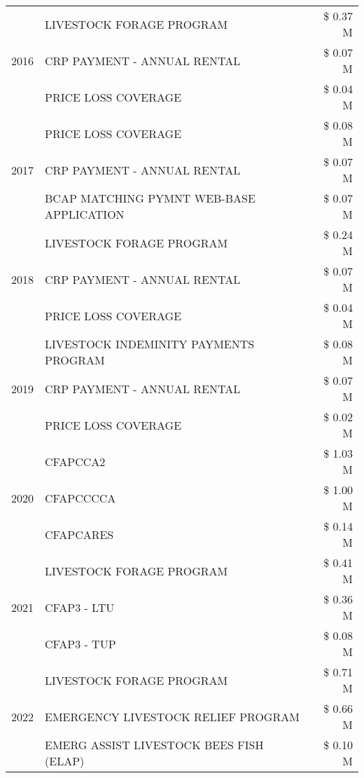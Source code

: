 \begin{tabular}{llr}
\cline{1-3}
\multirow[t]{3}{*}{2016} & LIVESTOCK FORAGE PROGRAM & \$ 0.37 M \\
 & CRP PAYMENT - ANNUAL RENTAL & \$ 0.07 M \\
 & PRICE LOSS COVERAGE & \$ 0.04 M \\
\cline{1-3}
\multirow[t]{3}{*}{2017} & PRICE LOSS COVERAGE & \$ 0.08 M \\
 & CRP PAYMENT - ANNUAL RENTAL & \$ 0.07 M \\
 & BCAP MATCHING PYMNT WEB-BASE APPLICATION & \$ 0.07 M \\
\cline{1-3}
\multirow[t]{3}{*}{2018} & LIVESTOCK FORAGE PROGRAM & \$ 0.24 M \\
 & CRP PAYMENT - ANNUAL RENTAL & \$ 0.07 M \\
 & PRICE LOSS COVERAGE & \$ 0.04 M \\
\cline{1-3}
\multirow[t]{3}{*}{2019} & LIVESTOCK INDEMINITY PAYMENTS PROGRAM & \$ 0.08 M \\
 & CRP PAYMENT - ANNUAL RENTAL & \$ 0.07 M \\
 & PRICE LOSS COVERAGE & \$ 0.02 M \\
\cline{1-3}
\multirow[t]{3}{*}{2020} & CFAPCCA2 & \$ 1.03 M \\
 & CFAPCCCCA & \$ 1.00 M \\
 & CFAPCARES & \$ 0.14 M \\
\cline{1-3}
\multirow[t]{3}{*}{2021} & LIVESTOCK FORAGE PROGRAM & \$ 0.41 M \\
 & CFAP3 - LTU & \$ 0.36 M \\
 & CFAP3 - TUP & \$ 0.08 M \\
\cline{1-3}
\multirow[t]{3}{*}{2022} & LIVESTOCK FORAGE PROGRAM & \$ 0.71 M \\
 & EMERGENCY LIVESTOCK RELIEF PROGRAM & \$ 0.66 M \\
 & EMERG ASSIST LIVESTOCK BEES FISH (ELAP) & \$ 0.10 M \\
\cline{1-3}
\bottomrule
\end{tabular}
